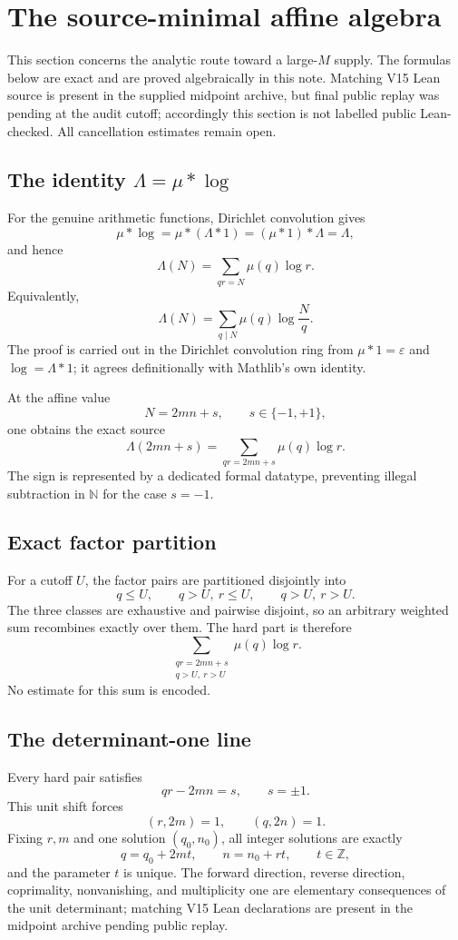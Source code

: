 \documentclass[11pt]{article}
\theoremstyle{definition}
\newcommand{\N}{\mathbb N}
\newcommand{\1}{\mathbf 1}
\begin{document}
\section{The source-minimal affine algebra}

This section concerns the analytic route toward a large-$M$ supply.  The formulas below
are exact and are proved algebraically in this note.  Matching V15 Lean source is present in
the supplied midpoint archive, but final public replay was pending at the audit cutoff;
accordingly this section is not labelled public Lean-checked.  All cancellation estimates
remain open.

\subsection{The identity $\Lambda=\mu*\log$}

For the genuine arithmetic functions, Dirichlet convolution gives
\[
\mu*\log=\mu*(\Lambda*1)=(\mu*1)*\Lambda=\Lambda,
\]
and hence
\[
\boxed{\Lambda(N)=\sum_{qr=N}\mu(q)\log r.}
\]
Equivalently,
\[
\Lambda(N)=\sum_{q\mid N}\mu(q)\log\frac Nq.
\]
The proof is carried out in the Dirichlet convolution ring from
$\mu*1=\varepsilon$ and $\log=\Lambda*1$; it agrees definitionally with Mathlib's own
identity.

At the affine value
\[
N=2mn+s,
\qquad s\in\{-1,+1\},
\]
one obtains the exact source
\[
\Lambda(2mn+s)=\sum_{qr=2mn+s}\mu(q)\log r.
\]
The sign is represented by a dedicated formal datatype, preventing illegal subtraction in
$\N$ for the case $s=-1$.

\subsection{Exact factor partition}

For a cutoff $U$, the factor pairs are partitioned disjointly into
\[
q\le U,
\qquad q>U,\ r\le U,
\qquad q>U,\ r>U.
\]
The three classes are exhaustive and pairwise disjoint, so an arbitrary weighted sum
recombines exactly over them.  The hard part is therefore
\[
\sum_{\substack{qr=2mn+s\\q>U,\ r>U}}\mu(q)\log r.
\]
No estimate for this sum is encoded.

\subsection{The determinant-one line}

Every hard pair satisfies
\[
qr-2mn=s,
\qquad s=\pm1.
\]
This unit shift forces
\[
(r,2m)=1,
\qquad(q,2n)=1.
\]
Fixing $r,m$ and one solution $(q_0,n_0)$, all integer solutions are exactly
\[
\boxed{q=q_0+2mt,
\qquad n=n_0+rt,
\qquad t\in\mathbb Z,}
\]
and the parameter $t$ is unique.  The forward direction, reverse direction, coprimality,
nonvanishing, and multiplicity one are elementary consequences of the unit determinant;
matching V15 Lean declarations are present in the midpoint archive pending public replay.
\end{document}
